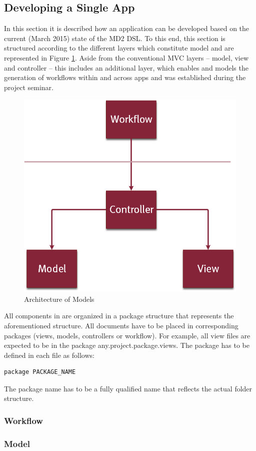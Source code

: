 
\subsection{Developing a Single App} 
\label{subsec:SingleAppDev}
In this section it is described how an application can be developed based on the current (March 2015) state of the MD2 DSL. To this end, this section is structured according to the different layers which constitute \MD model and are represented in Figure \ref{fig:MD2Arch}. Aside from the conventional MVC layers -- model, view and controller -- this includes an additional layer, which enables and models the generation of workflows within and across apps and was established during the project seminar.

\begin{figure}[htb!]
\centering
\includegraphics[width = 0.4\linewidth]{Fig/MD2Arch.png}
\caption{Architecture of \MD Models}
\label{fig:MD2Arch}
\end{figure}

All components in \MD are organized in a package structure that represents the aforementioned structure. All documents have to be placed in corresponding packages (views, models, controllers or workflow). For example, all view files are expected to be in the package any.project.package.views. The package has to be defined in each \MD file as follows:
\begin{lstlisting}
package PACKAGE_NAME
\end{lstlisting}
The package name has to be a fully qualified name that reflects the actual folder structure.

\subsubsection{Workflow} 
\label{subsubsec:Workflow}


\subsubsection{Model} 
\label{subsubsec:Model}


